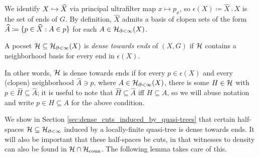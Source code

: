 \documentclass[reqno]{amsart}
\begin{document}
    We identify $X\hookrightarrow\widehat{X}$ via principal ultrafilter map $x\mapsto p_x$, so $\epsilon(X)\coloneqq\widehat{X}\comp X$ is the set of ends of $G$. By definition, $\widehat{X}$ admits a basis of clopen sets of the form $\widehat{A}\coloneqq\{p\in\widehat{X}: A\in p\}$ for each $A\in\mathcal{H}_{\partial<\infty}(X)$.

    \begin{definition}
        A pocset $\mathcal{H}\subseteq\mathcal{H}_{\partial<\infty}(X)$ is \textit{dense towards ends} of $(X,G)$ if $\mathcal{H}$ contains a neighborhood basis for every end in $\epsilon(X)$.

        In other words, $\mathcal{H}$ is dense towards ends if for every $p\in\epsilon(X)$ and every (clopen) neighborhood $\widehat{A}\ni p$, where $A\in\mathcal{H}_{\partial<\infty}(X)$, there is some $H\in\mathcal{H}$ with $p\in\widehat{H}\subseteq\widehat{A}$; it is useful to note that $\widehat{H}\subseteq\widehat{A}$ iff $H\subseteq A$, so we will abuse notation and write $p\in H\subseteq A$ for the above condition.
    \end{definition}

    We show in Section \ref{sec:dense_cuts_induced_by_quasi-trees} that certain half-spaces $\mathcal{H}\subseteq\mathcal{H}_{\partial<\infty}$ induced by a locally-finite quasi-tree is dense towards ends. It will also be important that these half-spaces be cuts, in that witnesses to density can also be found in $\mathcal{H}\cap\mathcal{H}_\mathrm{conn}$. The following lemma takes care of this.
\end{document}
